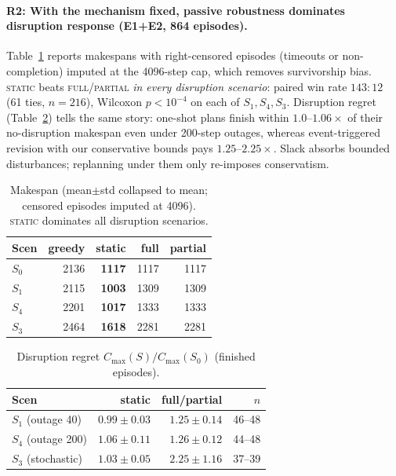 \documentclass[twocolumn]{article}
\newcommand{\cmax}{C_{\max}}
\begin{document}
\paragraph{R2: With the mechanism fixed, passive robustness dominates
disruption response (E1+E2, 864 episodes).}
Table~\ref{tab:imputed} reports makespans with right-censored episodes
(timeouts or non-completion) imputed at the 4096-step cap, which removes
survivorship bias. \textsc{static} beats \textsc{full}/\textsc{partial}
\emph{in every disruption scenario}: paired win rate
$143{:}12$ (61 ties, $n{=}216$), Wilcoxon
$p<10^{-4}$ on each of $S_1, S_4, S_3$. Disruption regret
(Table~\ref{tab:regret}) tells the same story: one-shot plans finish
within $1.0$--$1.06\times$ of their no-disruption makespan even under
200-step outages, whereas event-triggered revision with our conservative
bounds pays $1.25$--$2.25\times$. Slack absorbs bounded disturbances;
replanning under them only re-imposes conservatism.

\begin{table}[t]
\centering
\small
\begin{tabular}{lrrrr}
\toprule
Scen & greedy & static & full & partial \\
\midrule
$S_0$ & 2136 & \textbf{1117} & 1117 & 1117 \\
$S_1$ & 2115 & \textbf{1003} & 1309 & 1309 \\
$S_4$ & 2201 & \textbf{1017} & 1333 & 1333 \\
$S_3$ & 2464 & \textbf{1618} & 2281 & 2281 \\
\bottomrule
\end{tabular}
\caption{Makespan (mean$\pm$std collapsed to mean; censored episodes
imputed at 4096). \textsc{static} dominates all disruption scenarios.}
\label{tab:imputed}
\end{table}

\begin{table}[t]
\centering
\small
\begin{tabular}{lrrr}
\toprule
Scen & static & full/partial & $n$ \\
\midrule
$S_1$ (outage 40) & $0.99{\pm}0.03$ & $1.25{\pm}0.14$ & 46--48 \\
$S_4$ (outage 200) & $1.06{\pm}0.11$ & $1.26{\pm}0.12$ & 44--48 \\
$S_3$ (stochastic) & $1.03{\pm}0.05$ & $2.25{\pm}1.16$ & 37--39 \\
\bottomrule
\end{tabular}
\caption{Disruption regret $\cmax(S)/\cmax(S_0)$ (finished episodes).}
\label{tab:regret}
\end{table}
\end{document}

